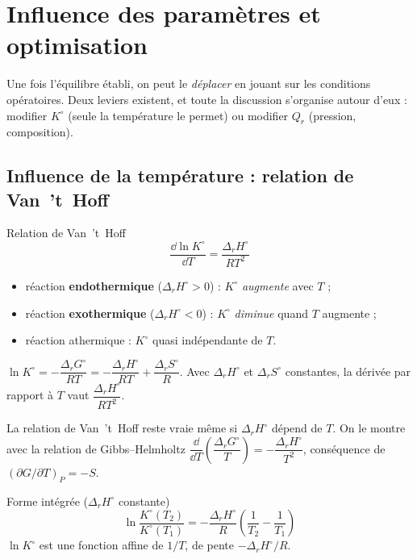 \chapter{Influence des paramètres et optimisation}
\label{ch:vanthoff}

Une fois l'équilibre établi, on peut le \emph{déplacer} en jouant sur les conditions opératoires. Deux leviers existent, et toute la discussion s'organise autour d'eux : modifier $K^\circ$ (seule la température le permet) ou modifier $Q_r$ (pression, composition).

\section{Influence de la température : relation de Van~'t~Hoff}

\begin{resultat}{Relation de Van~'t~Hoff}
\[ \boxed{\frac{\dd\ln K^\circ}{\dd T} = \frac{\Delta_rH^\circ}{RT^2}} \]
\begin{itemize}
  \item réaction \textbf{endothermique} ($\Delta_rH^\circ > 0$) : $K^\circ$ \emph{augmente} avec $T$ ;
  \item réaction \textbf{exothermique} ($\Delta_rH^\circ < 0$) : $K^\circ$ \emph{diminue} quand $T$ augmente ;
  \item réaction athermique : $K^\circ$ quasi indépendante de $T$.
\end{itemize}
\end{resultat}

\begin{demo}
$\ln K^\circ = -\dfrac{\Delta_rG^\circ}{RT} = -\dfrac{\Delta_rH^\circ}{RT} + \dfrac{\Delta_rS^\circ}{R}$. Avec $\Delta_rH^\circ$ et $\Delta_rS^\circ$ constantes, la dérivée par rapport à $T$ vaut $\dfrac{\Delta_rH^\circ}{RT^2}$.
\end{demo}

\begin{horsprog}
La relation de Van~'t~Hoff reste vraie même si $\Delta_rH^\circ$ dépend de $T$. On le montre avec la relation de Gibbs--Helmholtz $\dfrac{\dd}{\dd T}\left(\dfrac{\Delta_rG^\circ}{T}\right) = -\dfrac{\Delta_rH^\circ}{T^2}$, conséquence de $\left(\partial G/\partial T\right)_P = -S$.
\end{horsprog}

\begin{resultat}{Forme intégrée ($\Delta_rH^\circ$ constante)}
\[ \ln\frac{K^\circ(T_2)}{K^\circ(T_1)} = -\frac{\Delta_rH^\circ}{R}\left(\frac{1}{T_2}-\frac{1}{T_1}\right) \]
$\ln K^\circ$ est une fonction affine de $1/T$, de pente $-\Delta_rH^\circ/R$.
\end{resultat}

